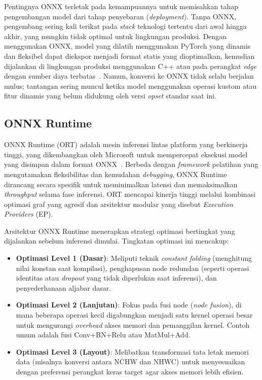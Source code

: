 Pentingnya ONNX terletak pada kemampuannya untuk memisahkan tahap
pengembangan model dari tahap penyebaran (\textit{deployment}). Tanpa
ONNX, pengembang sering kali terikat pada \textit{stack} teknologi
tertentu dari awal hingga akhir, yang mungkin tidak optimal untuk lingkungan
produksi. Dengan menggunakan ONNX, model yang dilatih menggunakan
PyTorch yang dinamis dan fleksibel dapat diekspor menjadi format statis
yang dioptimalkan, kemudian dijalankan di lingkungan produksi
menggunakan C++ atau pada perangkat \textit{edge} dengan sumber daya
terbatas~\cite{Sever2021A}. Namun, konversi ke ONNX tidak selalu berjalan
mulus; tantangan sering muncul ketika model menggunakan operasi kustom
atau fitur dinamis yang belum didukung oleh versi \textit{opset} standar
saat ini.

\subsection{ONNX Runtime}
ONNX Runtime (ORT) adalah mesin inferensi lintas platform yang berkinerja
tinggi, yang dikembangkan oleh Microsoft untuk mempercepat eksekusi model
yang disimpan dalam format ONNX~\cite{Sever2021A, Lin2019ONNC}.
Berbeda dengan \textit{framework} pelatihan yang mengutamakan fleksibilitas
dan kemudahan \textit{debugging}, ONNX Runtime dirancang secara spesifik
untuk meminimalkan latensi dan memaksimalkan \textit{throughput} selama
fase inferensi. ORT mencapai kinerja tinggi melalui kombinasi optimasi graf
yang agresif dan arsitektur modular yang disebut \textit{Execution Providers}
(EP).

Arsitektur ONNX Runtime menerapkan strategi optimasi bertingkat yang
dijalankan sebelum inferensi dimulai. Tingkatan optimasi ini mencakup:
\begin{itemize}
  \item \textbf{Optimasi Level 1 (Dasar)}: Meliputi teknik
    \textit{constant folding} (menghitung nilai konstan saat kompilasi),
    penghapusan node redundan (seperti operasi identitas atau
    \textit{dropout} yang tidak diperlukan saat inferensi), dan penyederhanaan
    aljabar dasar.
  \item \textbf{Optimasi Level 2 (Lanjutan)}: Fokus pada fusi node
    (\textit{node fusion}), di mana beberapa operasi kecil digabungkan
    menjadi satu kernel operasi besar untuk mengurangi \textit{overhead}
    akses memori dan pemanggilan kernel. Contoh umum adalah fusi
    Conv+BN+Relu atau MatMul+Add.
  \item \textbf{Optimasi Level 3 (Layout)}: Melibatkan transformasi
    tata letak memori data (misalnya konversi antara NCHW dan NHWC)
    untuk menyesuaikan dengan preferensi perangkat keras target agar akses
    memori lebih efisien.
\end{itemize}

